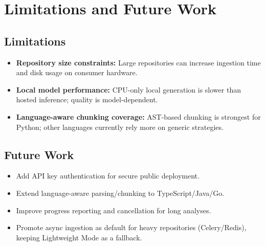 \documentclass[11pt,a4paper]{article}
\begin{document}
\section{Limitations and Future Work}
\subsection{Limitations}
\begin{itemize}[leftmargin=1.2em]
  \item \textbf{Repository size constraints:} Large repositories can increase ingestion time and disk usage on consumer hardware.
  \item \textbf{Local model performance:} CPU-only local generation is slower than hosted inference; quality is model-dependent.
  \item \textbf{Language-aware chunking coverage:} AST-based chunking is strongest for Python; other languages currently rely more on generic strategies.
\end{itemize}

\subsection{Future Work}
\begin{itemize}[leftmargin=1.2em]
  \item Add API key authentication for secure public deployment.
  \item Extend language-aware parsing/chunking to TypeScript/Java/Go.
  \item Improve progress reporting and cancellation for long analyses.
  \item Promote async ingestion as default for heavy repositories (Celery/Redis), keeping Lightweight Mode as a fallback.
\end{itemize}
\end{document}
